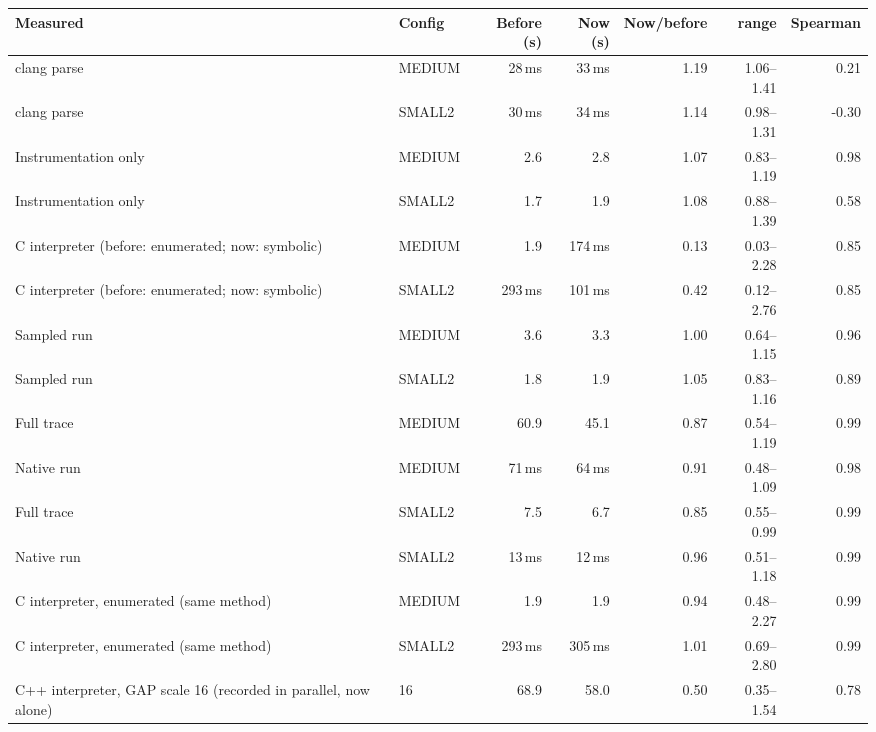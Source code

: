 \begin{tabular}{llrrrrr}
\toprule
Measured & Config & Before (s) & Now (s) & Now/before & range & Spearman \\
\midrule
clang parse & MEDIUM & 28\,ms & 33\,ms & 1.19 & 1.06--1.41 & 0.21 \\
clang parse & SMALL2 & 30\,ms & 34\,ms & 1.14 & 0.98--1.31 & -0.30 \\
Instrumentation only & MEDIUM & 2.6 & 2.8 & 1.07 & 0.83--1.19 & 0.98 \\
Instrumentation only & SMALL2 & 1.7 & 1.9 & 1.08 & 0.88--1.39 & 0.58 \\
C interpreter (before: enumerated; now: symbolic) & MEDIUM & 1.9 & 174\,ms & 0.13 & 0.03--2.28 & 0.85 \\
C interpreter (before: enumerated; now: symbolic) & SMALL2 & 293\,ms & 101\,ms & 0.42 & 0.12--2.76 & 0.85 \\
Sampled run & MEDIUM & 3.6 & 3.3 & 1.00 & 0.64--1.15 & 0.96 \\
Sampled run & SMALL2 & 1.8 & 1.9 & 1.05 & 0.83--1.16 & 0.89 \\
Full trace & MEDIUM & 60.9 & 45.1 & 0.87 & 0.54--1.19 & 0.99 \\
Native run & MEDIUM & 71\,ms & 64\,ms & 0.91 & 0.48--1.09 & 0.98 \\
Full trace & SMALL2 & 7.5 & 6.7 & 0.85 & 0.55--0.99 & 0.99 \\
Native run & SMALL2 & 13\,ms & 12\,ms & 0.96 & 0.51--1.18 & 0.99 \\
C interpreter, enumerated (same method) & MEDIUM & 1.9 & 1.9 & 0.94 & 0.48--2.27 & 0.99 \\
C interpreter, enumerated (same method) & SMALL2 & 293\,ms & 305\,ms & 1.01 & 0.69--2.80 & 0.99 \\
C++ interpreter, GAP scale 16 (recorded in parallel, now alone) & 16 & 68.9 & 58.0 & 0.50 & 0.35--1.54 & 0.78 \\
\bottomrule
\end{tabular}
